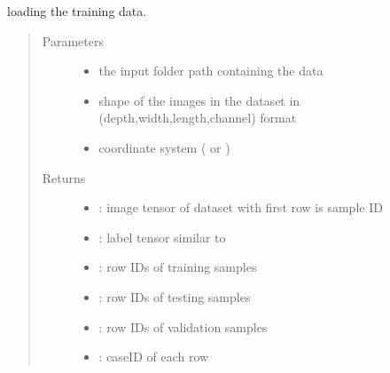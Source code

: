 \documentclass[letterpaper,10pt,english]{sphinxmanual}
\begin{document}
\begin{fulllineitems}
\label{\detokenize{index:util.load_data.load_train_data}}
loading the training data.
\begin{quote}\begin{description}
\item[{Parameters}] \leavevmode\begin{itemize}
\item {} 
 \textendash{} the input folder path containing the data

\item {} 
 \textendash{} shape of the images in the dataset in (depth,width,length,channel) format

\item {} 
 \textendash{} coordinate system ( or )

\end{itemize}

\item[{Returns}] \leavevmode
\begin{itemize}
\item {} 
: image tensor of dataset with first row is sample ID

\item {} 
: label tensor similar to 

\item {} 
: row IDs of training samples

\item {} 
: row IDs of testing samples

\item {} 
: row IDs of validation samples

\item {} 
: caseID of each row

\end{itemize}


\end{description}\end{quote}




{\hyperref[\detokenize{index:util.load_data.make_dataset}]{}}



\end{fulllineitems}
\end{document}
